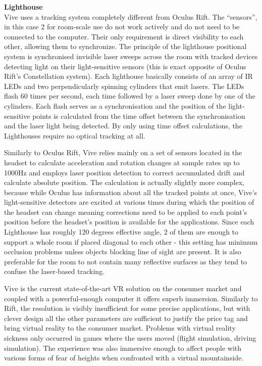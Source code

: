 \documentclass[12pt, a4paper]{article}
\begin{document}
\textbf{Lighthouse} \\
Vive uses a tracking system completely different from Oculus Rift. The “sensors”, in this case 2 for room-scale use do not work actively and do not need to be connected to the computer. Their only requirement is direct visibility to each other, allowing them to synchronize. The principle of the lighthouse positional system is synchronised invisible laser sweeps across the room with tracked devices detecting light on their light-sensitive sensors (this is exact opposite of Oculus Rift’s Constellation system). Each lighthouse basically consists of an array of IR LEDs and two perpendicularly spinning cylinders that emit lasers. The LEDs flash 60 times per second, each time followed by a laser sweep done by one of the cylinders. Each flash serves as a synchronisation and the position of the light-sensitive points is calculated from the time offset between the synchronisation and the laser light being detected. By only using time offset calculations, the Lighthouses require no optical tracking at all.

Similarly to Oculus Rift, Vive relies mainly on a set of sensors located in the headset to calculate acceleration and rotation changes at sample rates up to 1000Hz and employs laser position detection to correct accumulated drift and calculate absolute position. The calculation is actually slightly more complex, because while Oculus has information about all the tracked points at once, Vive’s light-sensitive detectors are excited at various times during which the position of the headset can change meaning corrections need to be applied to each point’s position before the headset’s position is available for the applications. Since each Lighthouse has roughly 120 degrees effective angle, 2 of them are enough to support a whole room if placed diagonal to each other - this setting has minimum occlusion problems unless objects blocking line of sight are present. It is also preferable for the room to not contain many reflective surfaces as they tend to confuse the laser-based tracking.

Vive is the current state-of-the-art VR solution on the consumer market and coupled with a powerful-enough computer it offers superb immersion. Similarly to Rift, the resolution is visibly insufficient for some precise applications, but with clever design all the other parameters are sufficient to justify the price tag and bring virtual reality to the consumer market. Problems with virtual reality sickness only occurred in games where the users moved (flight simulation, driving simulation). The experience was also immersive enough to affect people with various forms of fear of heights when confronted with a virtual mountainside.
\end{document}
